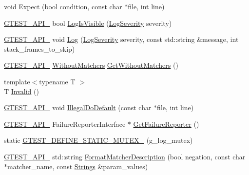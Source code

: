 \begin{DoxyCompactItemize}
\item 
void \mbox{\hyperlink{namespacetesting_1_1internal_a0dfe8a755bd02aa5ea162764b61a9d97}{Expect}} (bool condition, const char $\ast$file, int line)
\item 
\mbox{\hyperlink{gtest-port_8h_aa73be6f0ba4a7456180a94904ce17790}{G\+T\+E\+S\+T\+\_\+\+A\+P\+I\+\_\+}} bool \mbox{\hyperlink{namespacetesting_1_1internal_a69ffdba5ee36743e88d8f89b79e566ff}{Log\+Is\+Visible}} (\mbox{\hyperlink{namespacetesting_1_1internal_a203d1a8a2147a53d12bbdae40d443914}{Log\+Severity}} severity)
\item 
\mbox{\hyperlink{gtest-port_8h_aa73be6f0ba4a7456180a94904ce17790}{G\+T\+E\+S\+T\+\_\+\+A\+P\+I\+\_\+}} void \mbox{\hyperlink{namespacetesting_1_1internal_a8a57ce0412334a3f487bbaa8321febbe}{Log}} (\mbox{\hyperlink{namespacetesting_1_1internal_a203d1a8a2147a53d12bbdae40d443914}{Log\+Severity}} severity, const std\+::string \&message, int stack\+\_\+frames\+\_\+to\+\_\+skip)
\item 
\mbox{\hyperlink{gtest-port_8h_aa73be6f0ba4a7456180a94904ce17790}{G\+T\+E\+S\+T\+\_\+\+A\+P\+I\+\_\+}} \mbox{\hyperlink{classtesting_1_1internal_1_1WithoutMatchers}{Without\+Matchers}} \mbox{\hyperlink{namespacetesting_1_1internal_ad4e02ea077a717f95a10a03c10272f1c}{Get\+Without\+Matchers}} ()
\item 
{\footnotesize template$<$typename T $>$ }\\T \mbox{\hyperlink{namespacetesting_1_1internal_a3316c24e8a79f5def3e85d763ae50854}{Invalid}} ()
\item 
\mbox{\hyperlink{gtest-port_8h_aa73be6f0ba4a7456180a94904ce17790}{G\+T\+E\+S\+T\+\_\+\+A\+P\+I\+\_\+}} void \mbox{\hyperlink{namespacetesting_1_1internal_aa67e1e9d28122eedffbb7b6636824f2d}{Illegal\+Do\+Default}} (const char $\ast$file, int line)
\item 
\mbox{\hyperlink{gtest-port_8h_aa73be6f0ba4a7456180a94904ce17790}{G\+T\+E\+S\+T\+\_\+\+A\+P\+I\+\_\+}} Failure\+Reporter\+Interface $\ast$ \mbox{\hyperlink{namespacetesting_1_1internal_aa261c22df383e9007129c92e36e30e62}{Get\+Failure\+Reporter}} ()
\item 
static \mbox{\hyperlink{namespacetesting_1_1internal_a65647f11a4a74a4282c3cc6d422af0f1}{G\+T\+E\+S\+T\+\_\+\+D\+E\+F\+I\+N\+E\+\_\+\+S\+T\+A\+T\+I\+C\+\_\+\+M\+U\+T\+E\+X\+\_\+}} (g\+\_\+log\+\_\+mutex)
\item 
\mbox{\hyperlink{gtest-port_8h_aa73be6f0ba4a7456180a94904ce17790}{G\+T\+E\+S\+T\+\_\+\+A\+P\+I\+\_\+}} std\+::string \mbox{\hyperlink{namespacetesting_1_1internal_ace0ed89106e622e9b5da449ae269616d}{Format\+Matcher\+Description}} (bool negation, const char $\ast$matcher\+\_\+name, const \mbox{\hyperlink{namespacetesting_1_1internal_a50003bb76ec2934be1062be11efba8bf}{Strings}} \&param\+\_\+values)

\end{DoxyCompactItemize}
